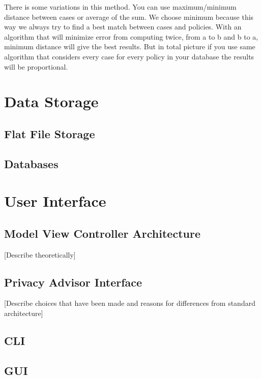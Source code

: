 There is some variations in this method. You can use maximum/minimum distance between cases or average of the sum. We choose minimum because this way we always try to find a best match between cases and policies. With an algorithm that will minimize error from computing twice, from a to b and b to a, minimum distance will give the best results. But in total picture if you use same algorithm that considers every case for every policy in your database the results will be proportional.




\section{Data Storage}


\subsection{Flat File Storage}



\subsection{Databases}

\section{User Interface}

\subsection{Model View Controller Architecture}
[Describe theoretically]

\subsection{Privacy Advisor Interface}
[Describe choices that have been made and reasons for differences from standard architecture]

\subsection{CLI}

\subsection{GUI}